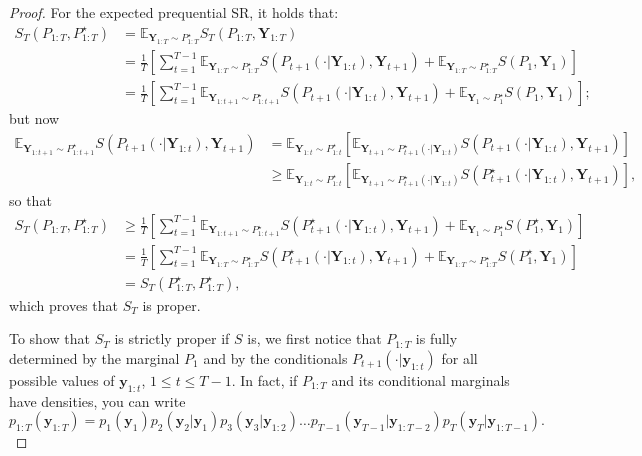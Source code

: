 \documentclass[twoside,11pt]{article}
\newcommand{\E}{\mathbb{E}}
\newcommand{\ddobs}{\mathbf{y}}
\newcommand{\Ddobs}{\mathbf{Y}}
\newcommand{\Ddobsupt}{\mathbf{Y}_{1:t}}
\newcommand{\DdobsupT}{\mathbf{Y}_{1:T}}
\begin{document}
\begin{proof}
		
		For the expected prequential SR, it holds that:
		\begin{equation}\label{key}
		\begin{aligned}
		S_T(P_{1:T}, P_{1:T}^\star) &= \E_{\DdobsupT\sim P^\star_{1:T}} S_T(P_{1:T}, \DdobsupT) \\
		&= \frac{1}{T} \left[\sum_{t=1}^{T-1} \E_{\DdobsupT\sim P^\star_{1:T}} S(P_{t+1}(\cdot|\Ddobsupt), \Ddobs_{t+1}) + \E_{\DdobsupT\sim P^\star_{1:T}} S(P_{1}, \Ddobs_{1}) \right] \\
		&=\frac{1}{T}\left[\sum_{t=1}^{T-1} \E_{\Ddobs_{1:t+1}\sim P^\star_{1:t+1}} S(P_{t+1}(\cdot|\Ddobsupt), \Ddobs_{t+1}) + \E_{\Ddobs_1\sim P^\star_{1}} S(P_{1}, \Ddobs_{1}) \right] ;
		\end{aligned}
		\end{equation}
		but now
		\begin{equation}\label{Eq:preq_SR_proof2}
		\begin{aligned}
		\E_{\Ddobs_{1:t+1}\sim P^\star_{1:t+1}} S(P_{t+1}(\cdot|\Ddobsupt), \Ddobs_{t+1}) &= \E_{\Ddobs_{1:t}\sim P^\star_{1:t}}\left[\E_{\Ddobs_{t+1}\sim P^\star_{t+1}(\cdot|\Ddobs_{1:t})}  S(P_{t+1}(\cdot|\Ddobsupt), \Ddobs_{t+1}) \right] \\
		&\ge \E_{\Ddobs_{1:t}\sim P^\star_{1:t}}\left[\E_{\Ddobs_{t+1}\sim P^\star_{t+1}(\cdot|\Ddobs_{1:t})}  S(P^\star_{t+1}(\cdot|\Ddobsupt), \Ddobs_{t+1}) \right],
		\end{aligned}
		\end{equation}
		so that
		\begin{equation}\label{Eq:preq_SR_proof}
		\begin{aligned}
		S_T(P_{1:T}, P_{1:T}^\star) &\ge \frac{1}{T}\left[\sum_{t=1}^{T-1} \E_{\Ddobs_{1:t+1}\sim P^\star_{1:t+1}} S(P_{t+1}^\star(\cdot|\Ddobsupt), \Ddobs_{t+1}) + \E_{\Ddobs_{1}\sim P_{1}^\star} S(P^\star_{1} ,\Ddobs_{1})\right]  \\
		&=\frac{1}{T} \left[\sum_{t=1}^{T-1}\E_{\Ddobs_{1:T}\sim P^\star_{1:T}} S(P_{t+1}^\star(\cdot|\Ddobsupt), \Ddobs_{t+1}) + \E_{\DdobsupT\sim P_{1:T}^\star} S(P^\star_{1} ,\Ddobs_{1})\right]  \\
		&= 	S_T(P^\star_{1:T}, P^\star_{1:T}),
		\end{aligned}
		\end{equation}
		which proves that $ S_T $ is proper. 
		
		To show that $ S_T $ is strictly proper if $ S $ is,
		we first notice that $ P_{1:T} $ is fully determined by the marginal $ P_1 $ and by the conditionals $ P_{t+1}(\cdot|\ddobs_{1:t}) $ for all possible values of $ \ddobs_{1:t} $, $ 1\le t \le T-1 $. In fact, if $ P_{1:T} $ and its conditional marginals have densities, you can write $$ p_{1:T}(\ddobs_{1:T}) = p_1(\ddobs_1)p_2(\ddobs_2|\ddobs_1)p_3(\ddobs_3|\ddobs_{1:2})\ldots p_{T-1}(\ddobs_{T-1}|\ddobs_{1:T-2})p_{T}(\ddobs_{T}|\ddobs_{1:T-1}).$$
		

\end{proof}
\end{document}
